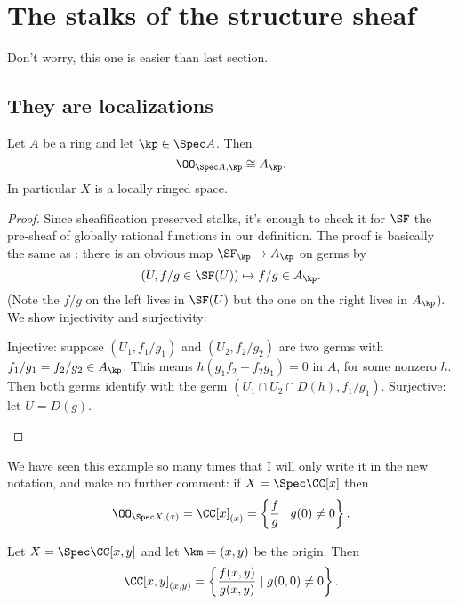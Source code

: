 \section{The stalks of the structure sheaf}

Don't worry, this one is easier than last section.

\subsection{They are localizations}
\begin{theorem}
	Let $A$ be a ring and let $\kp \in \Spec A$.
	Then \[ \OO_{\Spec A, \kp} \cong A_\kp. \]
	In particular $X$ is a locally ringed space.
\end{theorem}
\begin{proof}
	Since sheafification preserved stalks,
	it's enough to check it for $\SF$ the pre-sheaf
	of globally rational functions in our definition.
	The proof is basically the same as :
	there is an obvious map $\SF_\kp \to A_\kp$ on germs by
	\[ \left(U, f/g \in \SF(U) \right)
		\mapsto f/g \in A_\kp . \]
	(Note the $f/g$ on the left lives in $\SF(U)$
	but the one on the right lives in $A_\kp$).
	We show injectivity and surjectivity:
	\begin{itemize}
		\ii Injective: suppose $(U_1, f_1 / g_1)$ and $(U_2, f_2 / g_2)$
		are two germs with $f_1/g_1 = f_2/g_2 \in A_\kp$.
		This means $h(g_1 f_2 - f_2 g_1) = 0$ in $A$, for some nonzero $h$.
		Then both germs identify with
		the germ $(U_1 \cap U_2 \cap D(h), f_1 / g_1)$.
		\ii Surjective: let $U = D(g)$. \qedhere
	\end{itemize}
\end{proof}

\begin{example}
	We have seen this example so many times
	that I will only write it in the new notation,
	and make no further comment:
	if $X = \Spec \CC[x]$ then
	\[ \OO_{\Spec X, (x)} = \CC[x]_{(x)}
		= \left\{  \frac fg \mid g(0) \ne 0 \right\}. \]
\end{example}
\begin{example}
	Let $X = \Spec \CC[x,y]$ and let $\km = (x,y)$ be the origin.
	Then
	\[ \CC[x,y]_{(x,y)}
		= \left\{ \frac{f(x,y)}{g(x,y)} \mid g(0,0) \ne 0 \right\}. \]
\end{example}

